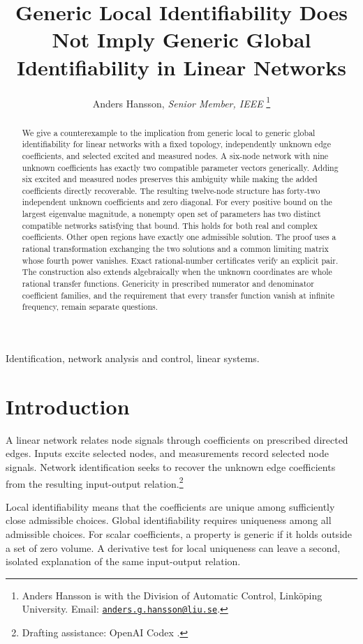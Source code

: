 \documentclass[letterpaper,10pt,conference]{ieeeconf}
\title{\LARGE\bf
Generic Local Identifiability Does Not Imply
Generic Global Identifiability in Linear Networks}
\author{Anders Hansson, \textit{Senior Member, IEEE}%
\thanks{Anders Hansson is with the Division of Automatic Control,
Link\"oping University. Email:
\href{mailto:anders.g.hansson@liu.se}{\texttt{anders.g.hansson@liu.se}}.}}
\newcommand{\aicite}{\footnote{Drafting assistance: OpenAI Codex \cite{codex}.}\space}
\begin{document}
\maketitle
\thispagestyle{empty}
\pagestyle{empty}

\begin{abstract}
We give a counterexample to the implication from generic local to
generic global identifiability for linear networks with a fixed
topology, independently unknown edge coefficients, and selected
excited and measured nodes. A six-node network with nine unknown
coefficients has exactly two compatible parameter vectors generically.
Adding six excited and measured nodes preserves this ambiguity while
making the added coefficients directly recoverable. The resulting
twelve-node structure has forty-two independent unknown coefficients
and zero diagonal. For every positive bound on the largest eigenvalue
magnitude, a nonempty open set of parameters has two distinct compatible
networks satisfying that bound. This holds for both real and complex
coefficients. Other open regions have exactly one admissible solution.
The proof uses a rational transformation exchanging the two solutions
and a common limiting matrix whose fourth power vanishes. Exact
rational-number certificates verify an explicit pair. The construction
also extends algebraically when the unknown coordinates are whole
rational transfer functions. Genericity in prescribed numerator and
denominator coefficient families, and the requirement that every
transfer function vanish at infinite frequency, remain separate questions.
\end{abstract}

\begin{keywords}
Identification, network analysis and control, linear systems.
\end{keywords}

\section{Introduction}\label{sec:intro}

A linear network relates node signals through coefficients on prescribed
directed edges. Inputs excite selected nodes, and measurements record
selected node signals. Network identification seeks to recover the
unknown edge coefficients from the resulting input-output relation.\aicite

Local identifiability means that the coefficients are unique among
sufficiently close admissible choices. Global identifiability requires
uniqueness among all admissible choices. For scalar coefficients,
a property is generic if it holds outside a set of zero volume.
A derivative test for local uniqueness can leave a second, isolated
explanation of the same input-output relation.
\end{document}
